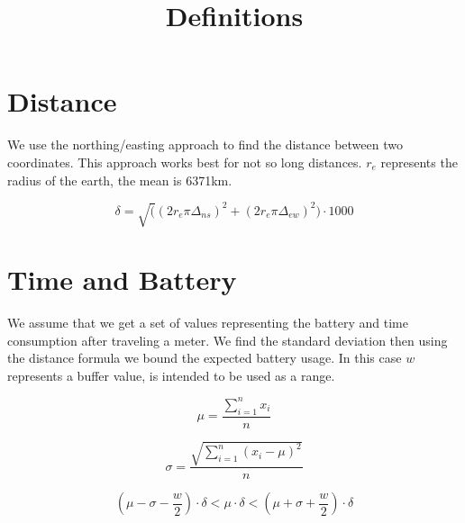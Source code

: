 \documentclass{article}
\title{Definitions}
\begin{document}
\maketitle


\section{Distance}
We use the northing/easting approach to find the distance between two coordinates. This approach works best for not so long distances. $r_{e}$ represents the radius of the earth, the mean is 6371km. 


\[\delta = \sqrt((2r_{e}\pi\Delta_{ns})^2 + (2r_{e}\pi\Delta_{ew})^2) \cdot 1000\] 


\section{Time and Battery}
We assume that we get a set of values representing the battery and time consumption after traveling a meter. We find the standard deviation then using the distance formula we bound the expected battery usage. In this case $w$ represents a buffer value, is intended to be used as a range.

\[ \mu = \dfrac{\sum_{i = 1}^{n}{x_{i}}}{n} \]

\[ \sigma = \dfrac{\sqrt{\sum_{i = 1}^{n}(x_{i} - \mu)^2}}{n} \]

\[ (\mu - \sigma - \dfrac{w}{2})\cdot\delta  < \mu\cdot\delta < (\mu+\sigma + \dfrac{w}{2} )\cdot\delta  \]
\end{document}
